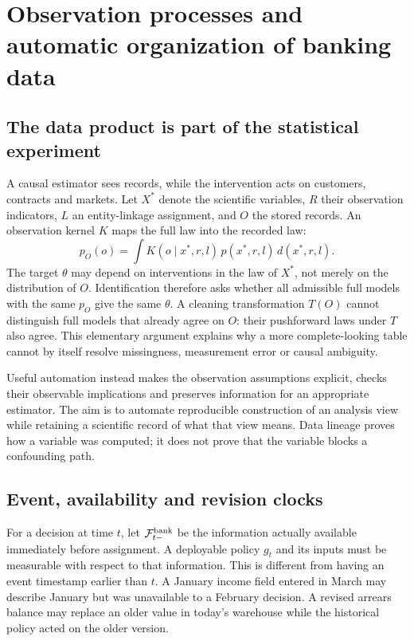 \chapter{Observation processes and automatic organization of banking data}
\label{r3:observation}
\section{The data product is part of the statistical experiment}
A causal estimator sees records, while the intervention acts on customers,
contracts and markets. Let $X^*$ denote the scientific variables, $R$ their
observation indicators, $L$ an entity-linkage assignment, and $O$ the stored
records. An observation kernel $K$ maps the full law into the recorded law:
\begin{equation}
 p_O(o)=\int K(o\mid x^*,r,l)\,p(x^*,r,l)\,d(x^*,r,l).
 \label{r3:observation-kernel}
\end{equation}
The target $\theta$ may depend on interventions in the law of $X^*$,
not merely on the distribution of $O$. Identification therefore asks
whether all admissible full models with the same $p_O$ give the same
$\theta$. A cleaning transformation $T(O)$ cannot distinguish full models
that already agree on $O$: their pushforward laws under $T$ also agree.
This elementary argument explains why a more complete-looking table
cannot by itself resolve missingness, measurement error or causal ambiguity.

Useful automation instead makes the observation assumptions explicit,
checks their observable implications and preserves information for an
appropriate estimator. The aim is to automate reproducible construction
of an analysis view while retaining a scientific record of what that view
means. Data lineage proves how a variable was computed; it does not prove
that the variable blocks a confounding path.

\section{Event, availability and revision clocks}
\label{r3:availability}
For a decision at time $t$, let $\mathcal F^{\rm bank}_{t-}$ be the
information actually available immediately before assignment. A deployable
policy $g_t$ and its inputs must be measurable with respect to that
information. This is different from having an event timestamp earlier
than $t$. A January income field entered in March may describe January
but was unavailable to a February decision. A revised arrears balance
may replace an older value in today's warehouse while the historical
policy acted on the older version.

